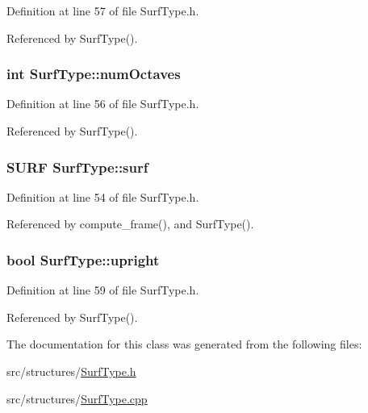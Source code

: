 \-Definition at line 57 of file \-Surf\-Type.\-h.



\-Referenced by \-Surf\-Type().

\hypertarget{class_surf_type_a1f2c7c2d1bc455ea0292e3cb2cdb2945}{
\subsubsection[{num\-Octaves}]{\setlength{\rightskip}{0pt plus 5cm}int {\bf \-Surf\-Type\-::num\-Octaves}}}
\label{class_surf_type_a1f2c7c2d1bc455ea0292e3cb2cdb2945}


\-Definition at line 56 of file \-Surf\-Type.\-h.



\-Referenced by \-Surf\-Type().

\hypertarget{class_surf_type_a0d929e792bddaf2abdaed0d5ce2a5389}{
\subsubsection[{surf}]{\setlength{\rightskip}{0pt plus 5cm}\-S\-U\-R\-F {\bf \-Surf\-Type\-::surf}}}
\label{class_surf_type_a0d929e792bddaf2abdaed0d5ce2a5389}


\-Definition at line 54 of file \-Surf\-Type.\-h.



\-Referenced by compute\-\_\-frame(), and \-Surf\-Type().

\hypertarget{class_surf_type_af741d37b95d0569d8cf31b3703ff0a86}{
\subsubsection[{upright}]{\setlength{\rightskip}{0pt plus 5cm}bool {\bf \-Surf\-Type\-::upright}}}
\label{class_surf_type_af741d37b95d0569d8cf31b3703ff0a86}


\-Definition at line 59 of file \-Surf\-Type.\-h.



\-Referenced by \-Surf\-Type().



\-The documentation for this class was generated from the following files\-:\begin{DoxyCompactItemize}
\item 
src/structures/\hyperlink{_surf_type_8h}{\-Surf\-Type.\-h}\item 
src/structures/\hyperlink{_surf_type_8cpp}{\-Surf\-Type.\-cpp}\end{DoxyCompactItemize}
